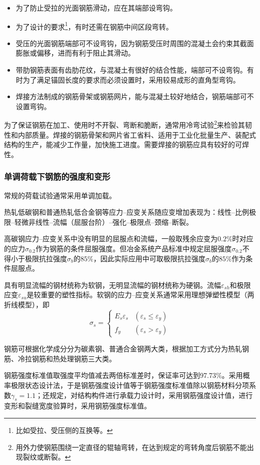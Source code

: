 \documentclass{article}
\begin{document}
\begin{itemize}
      \item 为了防止受拉的光面钢筋滑动，应在其端部设弯钩。
      \item 为了设计的要求\footnote{比如受拉、受压侧的互换等。}，有时还需在钢筋中间区段弯转。
      \item 受压的光面钢筋端部可不设弯钩，因为钢筋受压时周围的混凝土会约束其截面膨胀或偏移，进而有利于阻止其滑动。
      \item 带肋钢筋表面有齿肋花纹，与混凝土有很好的结合性能，端部可不设弯钩。有时为了满足锚固长度的要求而必须设置时，采用较易成形的直角型弯钩。
      \item 焊接方法制成的钢筋骨架或钢筋网片，能与混凝土较好地结合，钢筋端部可不设置弯钩。
\end{itemize}
\par 为了保证钢筋在加工、使用时不开裂、弯断和脆断，通常用冷弯试验\footnote{用外力使钢筋围绕一定直径的辊轴弯转，在达到规定的弯转角度后钢筋不能出现裂纹或断裂。}来检验其韧性和内部质量。焊接的钢筋骨架和网片省工省料、适用于工业化批量生产、装配式结构的生产，能减少工作量，加快施工进度。需要焊接的钢筋应具有较好的可焊性。
\subsubsection{单调荷载下钢筋的强度和变形}
\par 常规的荷载试验通常采用单调加载。
\par 热轧低碳钢和普通热轧低合金钢等应力--应变关系随应变增加表现为：线性--比例极限--轻微非线性--流幅（屈服台阶）--强化--极限点--颈缩--断裂。
\par 高碳钢应力--应变关系中没有明显的屈服点和流幅，一般取残余应变为$0.2\%$时对应的应力$\sigma_{0.2}$作为钢筋的条件屈服强度。但冶金系统产品标准中规定屈服强度$\sigma_{0.2}$不得小于极限抗拉强度$\sigma_b$的$85\%$，因此实际应用中可取极限抗拉强度$\sigma_b$的$85\%$作为条件屈服点。
\par 具有明显流幅的钢材统称为软钢，无明显流幅的钢材统称为硬钢。流幅$\varepsilon_{sh}$和极限应变$\varepsilon_{su}$是较重要的塑性指标。软钢的应力--应变关系通常采用理想弹塑性模型（两折线模型），即
$$
      \sigma_s =
      \left\{ \begin{aligned}
            E_s \varepsilon_s & (\varepsilon_s \leq \varepsilon_y) \\
            f_y               & (\varepsilon_s >\varepsilon_y)
      \end{aligned} \right.
$$
\par 钢筋可根据化学成分分为碳素钢、普通合金钢两大类，根据加工方式分为热轧钢筋、冷拉钢筋和热处理钢筋三大类。
\par 钢筋强度标准值取强度平均值减去两倍标准差时，保证率可达到97.73\%。\gb{}采用概率极限状态设计法，于是钢筋强度设计值等于钢筋强度标准值除以钢筋材料分项系数$\gamma_s=1.1$；还规定，对结构构件进行承载力设计时，采用钢筋强度设计值，进行变形和裂缝宽度验算时，采用钢筋强度标准值。
\end{document}
